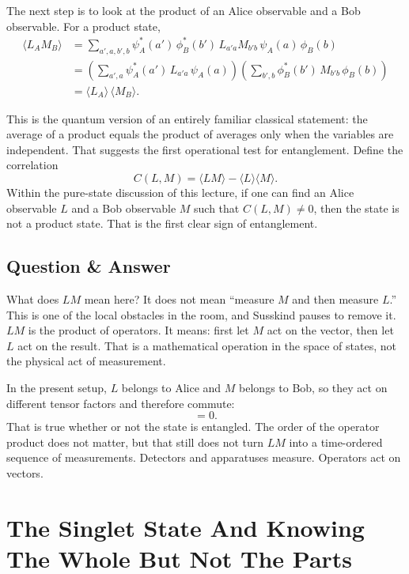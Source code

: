 The next step is to look at the product of an Alice observable and a Bob observable. For a product state,
\begin{align}
\langle L_A M_B\rangle
&=
\sum_{a',a,b',b}
\psi_A^*(a')\,\phi_B^*(b')\,
L_{a'a}M_{b'b}\,
\psi_A(a)\,\phi_B(b) \\
&=
\left(
\sum_{a',a}\psi_A^*(a')\,L_{a'a}\,\psi_A(a)
\right)
\left(
\sum_{b',b}\phi_B^*(b')\,M_{b'b}\,\phi_B(b)
\right) \\
&=
\langle L_A\rangle\,\langle M_B\rangle.
\end{align}

This is the quantum version of an entirely familiar classical statement: the average of a product equals the product of averages only when the variables are independent. That suggests the first operational test for entanglement. Define the correlation
\begin{equation}
C(L,M)=\langle LM\rangle-\langle L\rangle\langle M\rangle.
\end{equation}
Within the pure-state discussion of this lecture, if one can find an Alice observable $L$ and a Bob observable $M$ such that $C(L,M)\neq 0$, then the state is not a product state. That is the first clear sign of entanglement.

\subsection{Question \& Answer}

What does $LM$ mean here? It does not mean ``measure $M$ and then measure $L$.'' This is one of the local obstacles in the room, and Susskind pauses to remove it. $LM$ is the product of operators. It means: first let $M$ act on the vector, then let $L$ act on the result. That is a mathematical operation in the space of states, not the physical act of measurement.

In the present setup, $L$ belongs to Alice and $M$ belongs to Bob, so they act on different tensor factors and therefore commute:
\begin{equation}
[L,M]=0.
\end{equation}
That is true whether or not the state is entangled. The order of the operator product does not matter, but that still does not turn $LM$ into a time-ordered sequence of measurements. Detectors and apparatuses measure. Operators act on vectors.

\section{The Singlet State And Knowing The Whole But Not The Parts}

